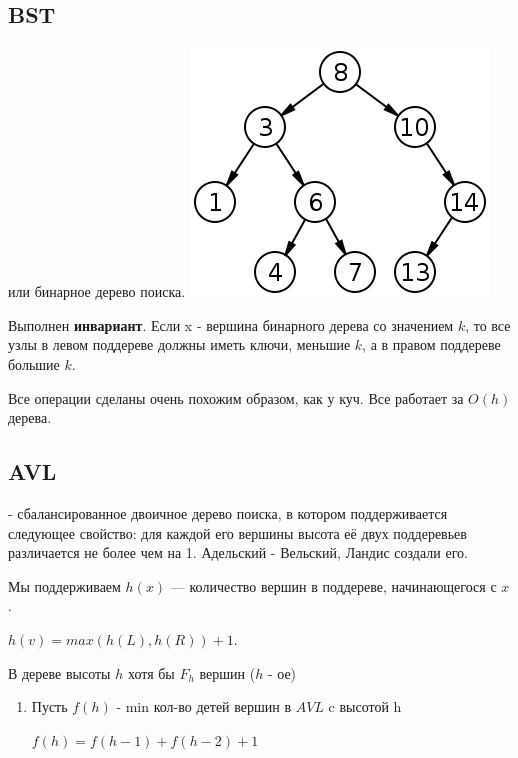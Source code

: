 
\subsection{BST}
\begin{center}
  или бинарное дерево поиска.
\includegraphics{assets/Binary_search_tree.png}    
\end{center}

Выполнен \textbf{инвариант}. Если x - вершина бинарного дерева со значением $k$, то все узлы в левом поддереве должны иметь ключи, меньшие $k$, а в правом поддереве большие $k$.

Все операции сделаны очень похожим образом, как у куч. Все работает за $O(h)$ дерева.

\subsection{AVL}



 - сбалансированное двоичное дерево поиска, в котором поддерживается следующее свойство: для каждой его вершины высота её двух поддеревьев различается не более чем на 1. Адельский - Вельский, Ландис создали его.

Мы поддерживаем $h(x)$ --- количество вершин в поддереве, начинающегося с $x$.

$h(v) = max(h(L),h(R)) + 1 $.


В дереве высоты $h$ хотя бы $F_h$ вершин ($h$ - ое)

\begin{enumerate}
    \item[] \prooff{}

    Пусть $f(h)$ - min кол-во детей вершин в $AVL$ c высотой h

    $f(h) = f(h-1) + f(h-2) + 1$
\end{enumerate}


